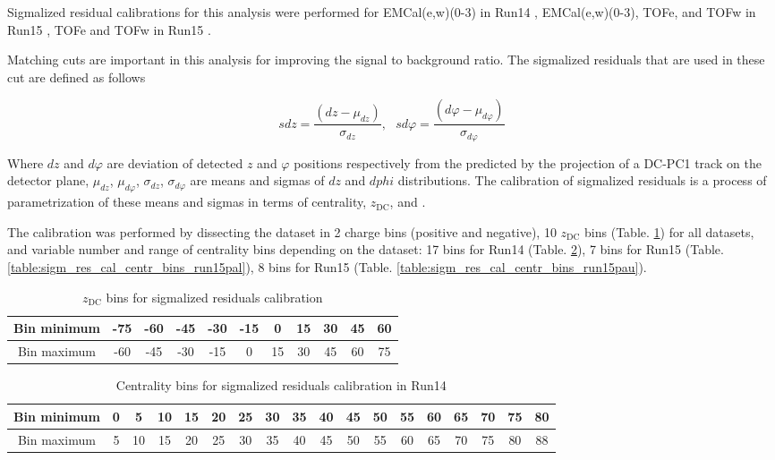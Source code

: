 Sigmalized residual calibrations for this analysis were performed for EMCal(e,w)(0-3) in Run14 \HeAu, EMCal(e,w)(0-3), TOFe, and TOFw in Run15 \pAl, TOFe and TOFw in Run15 \pAu.

Matching cuts are important in this analysis for improving the signal to background ratio.
The sigmalized residuals that are used in these cut are defined as follows

\begin{equation}
   sdz = \frac{(dz - \mu_{dz})}{\sigma_{dz}}, \ \ \ sd\varphi = \frac{(d\varphi - \mu_{d\varphi})}{\sigma_{d\varphi}}
\end{equation}

Where $dz$ and $d\varphi$ are deviation of detected $z$ and $\varphi$ positions respectively from the predicted by the projection of a DC-PC1 track on the detector plane,
$\mu_{dz}$, $\mu_{d\varphi}$, $\sigma_{dz}$, $\sigma_{d\varphi}$ are means and sigmas of $dz$ and $dphi$ distributions.
The calibration of sigmalized residuals is a process of parametrization of these means and sigmas in terms of centrality, $z_{\text{DC}}$, and \pT. 

The calibration was performed by dissecting the dataset in 2 charge bins (positive and negative), 10 $z_{\text{DC}}$ bins (Table. \ref{table:sigm_res_cal_zdc_bins}) for all datasets, and variable number and range of centrality bins depending on the dataset: 17 bins for Run14 \HeAu (Table. \ref{table:sigm_res_cal_centr_bins_run14heau}), 7 bins for Run15 \pAl (Table. \ref{table:sigm_res_cal_centr_bins_run15pal}), 8 bins for Run15 \pAu (Table. \ref{table:sigm_res_cal_centr_bins_run15pau}).

\begin{table}[h!]
	\centering
	\begin{tabular}{c||c|c|c|c|c|c|c|c|c|c}
      Bin minimum & -75 & -60 & -45 & -30 & -15 & 0 & 15 & 30 & 45 & 60 \\
      \hline
      Bin maximum & -60 & -45 & -30 & -15 & 0 & 15 & 30 & 45 & 60 & 75 \\
	\end{tabular}
   \caption{$z_{\text{DC}}$ bins for sigmalized residuals calibration}
	\label{table:sigm_res_cal_zdc_bins}
\end{table}

\begin{table}[h!]
	\centering
	\begin{tabular}{c||c|c|c|c|c|c|c|c|c|c|c|c|c|c|c|c|c}
      Bin minimum & 0 & 5 & 10 & 15 & 20 & 25 & 30 & 35 & 40 & 45 & 50 & 55 & 60 & 65 & 70 & 75 & 80 \\
      \hline
      Bin maximum & 5 & 10 & 15 & 20 & 25 & 30 & 35 & 40 & 45 & 50 & 55 & 60 & 65 & 70 & 75 & 80 & 88 \\
	\end{tabular}
   \caption{Centrality bins for sigmalized residuals calibration in Run14 \HeAu}
	\label{table:sigm_res_cal_centr_bins_run14heau}
\end{table}

